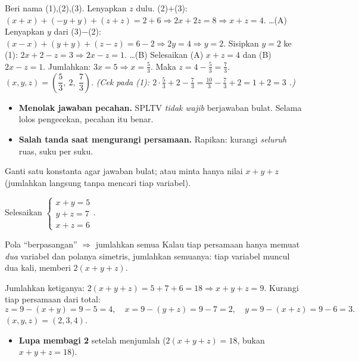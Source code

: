 \jawab
{} Beri nama (1),(2),(3). Lenyapkan $z$ dulu.
(2)$+$(3): $(x+x)+(-y+y)+(z+z)=2+6\Rightarrow 2x+2z=8\Rightarrow x+z=4$. \dots(A)
 Lenyapkan $y$ dari (3)$-$(2): $(x-x)+(y+y)+(z-z)=6-2\Rightarrow
2y=4\Rightarrow y=2$.
 Sisipkan $y=2$ ke (1): $2x+2-z=3\Rightarrow 2x-z=1$. \dots(B)
 Selesaikan (A) $x+z=4$ dan (B) $2x-z=1$. Jumlahkan: $3x=5\Rightarrow
x=\frac53$. Maka $z=4-\frac53=\frac73$.
\jadi $(x,y,z)=\left(\dfrac53,\ 2,\ \dfrac73\right)$.
\emph{(Cek pada (1): $2\cdot\frac53+2-\frac73=\frac{10}{3}-\frac73+2=1+2=3$
\checkmark.)}

\begin{jebakan}
\begin{itemize}[leftmargin=*,topsep=2pt]
  \item \textbf{Menolak jawaban pecahan.} SPLTV \emph{tidak wajib} berjawaban
  bulat. Selama lolos pengecekan, pecahan itu benar.
  \item \textbf{Salah tanda saat mengurangi persamaan.} Rapikan: kurangi
  \emph{seluruh} ruas, suku per suku.
\end{itemize}
\end{jebakan}

\begin{variasi}
Ganti satu konstanta agar jawaban bulat; atau minta hanya nilai $x+y+z$
(jumlahkan langsung tanpa mencari tiap variabel).
\end{variasi}

\begin{soalbox}{}
Selesaikan $\begin{cases} x+y=5\\ y+z=7\\ x+z=6\end{cases}$.
\end{soalbox}

\begin{ingat}{Pola ``berpasangan'' $\Rightarrow$ jumlahkan semua}
Kalau tiap persamaan hanya memuat \emph{dua} variabel dan polanya simetris,
jumlahkan semuanya: tiap variabel muncul dua kali, memberi $2(x+y+z)$.
\end{ingat}

\jawab
{} Jumlahkan ketiganya: $2(x+y+z)=5+7+6=18\Rightarrow x+y+z=9$.
 Kurangi tiap persamaan dari total:
\[
z=9-(x+y)=9-5=4,\quad x=9-(y+z)=9-7=2,\quad y=9-(x+z)=9-6=3.
\]
\jadi $(x,y,z)=(2,3,4)$.

\begin{jebakan}
\begin{itemize}[leftmargin=*,topsep=2pt]
  \item \textbf{Lupa membagi 2} setelah menjumlah ($2(x+y+z)=18$, bukan
  $x+y+z=18$).
\end{itemize}
\end{jebakan}

